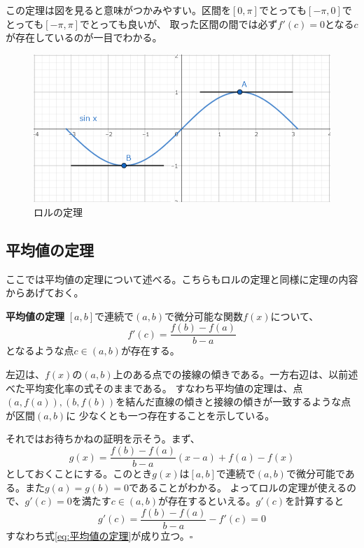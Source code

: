 \documentclass[a4j,dvipdfmx]{jsarticle}
\begin{document}
                    この定理は図を見ると意味がつかみやすい。区間を$[0,\pi]$でとっても$[-\pi,0]$でとっても$[-\pi,\pi]$でとっても良いが、
                    取った区間の間では必ず$f'(c)=0$となる$c$が存在しているのが一目でわかる。

                    \begin{figure}[h]
                        \centering
                        \includegraphics[scale=0.5]{img/QuuNote/rollTheory.png}
                        \caption{ロルの定理}
                    \end{figure}
                \clearpage
                \subsection{平均値の定理}
                    ここでは平均値の定理について述べる。こちらもロルの定理と同様に定理の内容からあげておく。
                    \begin{itembox}{\textbf{平均値の定理}}
                        $[a,b]$で連続で$(a,b)$で微分可能な関数$f(x)$について、
                        \begin{equation}
                            f'(c)=\frac{f(b)-f(a)}{b-a}\label{eq:平均値の定理}
                        \end{equation}
                        となるような点$c\in(a,b)$が存在する。
                    \end{itembox}
                    左辺は、$f(x)$の$(a,b)$上のある点での接線の傾きである。一方右辺は、以前述べた平均変化率の式そのままである。
                    すなわち平均値の定理は、点$(a,f(a)),(b,f(b))$を結んだ直線の傾きと接線の傾きが一致するような点が区間$(a,b)$に
                    少なくとも一つ存在することを示している。

                    それではお待ちかねの証明を示そう。まず、
                    \begin{equation*}
                        g(x)=\frac{f(b)-f(a)}{b-a}(x-a)+f(a)-f(x)
                    \end{equation*}
                    としておくことにする。このとき$g(x)$は$[a,b]$で連続で$(a,b)$で微分可能である。また$g(a)=g(b)=0$であることがわかる。
                    よってロルの定理が使えるので、$g'(c)=0$を満たす$c\in(a,b)$が存在するといえる。$g'(c)$を計算すると
                    \begin{equation*}
                        g'(c)=\frac{f(b)-f(a)}{b-a}-f'(c)=0
                    \end{equation*}
                    すなわち式\ref{eq:平均値の定理}が成り立つ。$\square$
\end{document}
